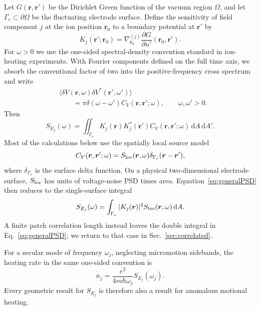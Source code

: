 \documentclass[aps,pra,twocolumn,superscriptaddress,longbibliography,nofootinbib,floatfix]{revtex4-2}
\theoremstyle{remark}
\newcommand{\dd}{\mathrm d}
\begin{document}
Let $G(\bm r,\bm r')$ be the Dirichlet Green function of the vacuum region $\Omega$, and let $\Gamma_e\subset\partial\Omega$ be the fluctuating electrode surface.  Define the sensitivity of field component $j$ at the ion position $\bm r_0$ to a boundary potential at $\bm r'$ by
\begin{equation}
K_j(\bm r';\bm r_0)=\nabla_{\bm r_0}^{(j)}
\frac{\partial G}{\partial n'}(\bm r_0,\bm r').
\label{eq:Kdef}
\end{equation}
For $\omega>0$ we use the one-sided spectral-density convention standard in ion-heating experiments.  With Fourier components defined on the full time axis, we absorb the conventional factor of two into the positive-frequency cross spectrum and write
\begin{align}
&\langle\delta V(\bm r,\omega)\delta V^*(\bm r',\omega')\rangle\nonumber\\
&\qquad=\pi\delta(\omega-\omega')C_V(\bm r,\bm r';\omega),
\qquad \omega,\omega'>0.
\label{eq:covdef}
\end{align}
Then
\begin{equation}
S_{E_j}(\omega)=\iint_{\Gamma_e} K_j(\bm r)K_j^*(\bm r')
C_V(\bm r,\bm r';\omega)\,\dd A\,\dd A'.
\label{eq:generalPSD}
\end{equation}
Most of the calculations below use the spatially local source model
\begin{equation}
C_V(\bm r,\bm r';\omega)=S_{\rm loc}(\bm r,\omega)
\delta_{\Gamma_e}(\bm r-\bm r'),
\label{eq:localcov}
\end{equation}
where $\delta_{\Gamma_e}$ is the surface delta function.  On a physical two-dimensional electrode surface, $S_{\rm loc}$ has units of voltage-noise PSD times area.  Equation~\eqref{eq:generalPSD} then reduces to the single-surface integral
\begin{equation}
S_{E_j}(\omega)=\int_{\Gamma_e}|K_j(\bm r)|^2
S_{\rm loc}(\bm r,\omega)\,\dd A.
\label{eq:localforward}
\end{equation}
A finite patch correlation length instead leaves the double integral in Eq.~\eqref{eq:generalPSD}; we return to that case in Sec.~\ref{sec:correlated}.

For a secular mode of frequency $\omega_j$, neglecting micromotion sidebands, the heating rate in the same one-sided convention is \cite{Turchette2000,Brownnutt2015}
\begin{equation}
\boxed{\displaystyle
\dot{\bar n}_j=\frac{e^2}{4m\hbar\omega_j}S_{E_j}(\omega_j).}
\label{eq:heatingrate}
\end{equation}
Every geometric result for $S_{E_j}$ is therefore also a result for anomalous motional heating.
\end{document}
